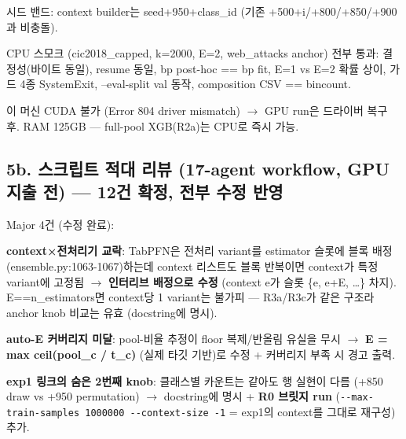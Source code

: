 \par\noindent \textbullet\enspace 시드 밴드: context builder는 seed+\allowbreak{}950+\allowbreak{}class\_\allowbreak{}id (기존 +\allowbreak{}500+\allowbreak{}i/\allowbreak{}+\allowbreak{}800/\allowbreak{}+\allowbreak{}850/\allowbreak{}+\allowbreak{}900과 비충돌).


\par\noindent \textbullet\enspace CPU 스모크 (cic2018\_\allowbreak{}capped, k=\allowbreak{}2000, E=\allowbreak{}2, web\_\allowbreak{}attacks anchor) 전부 통과: 결정성(바이트 동일), resume 동일, bp post-hoc =\allowbreak{}=\allowbreak{} bp fit, E=\allowbreak{}1 vs E=\allowbreak{}2 확률 상이, 가드 4종 SystemExit, --eval-split val 동작, composition CSV =\allowbreak{}=\allowbreak{} bincount.


\par\noindent \textbullet\enspace 이 머신 CUDA 불가 (Error 804 driver mismatch)  \ensuremath{\rightarrow}  GPU run은 드라이버 복구 후. RAM 125GB — full-pool XGB(R2a)는 CPU로 즉시 가능.


\subsection{5b. 스크립트 적대 리뷰 (17-agent workflow, GPU 지출 전) — 12건 확정, 전부 수정 반영}
Major 4건 (수정 완료):

\par\noindent \textbullet\enspace \textbf{context×전처리기 교락}: TabPFN은 전처리 variant를 estimator 슬롯에 블록 배정 (ensemble.py:1063-1067)하는데 context 리스트도 블록 반복이면 context가 특정 variant에 고정됨  \ensuremath{\rightarrow}  \textbf{인터리브 배정으로 수정} (context e가 슬롯 \{e, e+\allowbreak{}E, …\} 차지). E=\allowbreak{}=\allowbreak{}n\_\allowbreak{}estimators면 context당 1 variant는 불가피 — R3a/\allowbreak{}R3c가 같은 구조라 anchor knob 비교는 유효 (docstring에 명시).


\par\noindent \textbullet\enspace \textbf{auto-E 커버리지 미달}: pool-비율 추정이 floor 복제/\allowbreak{}반올림 유실을 무시  \ensuremath{\rightarrow}  \textbf{E =\allowbreak{} max ceil(pool\_\allowbreak{}c /\allowbreak{} t\_\allowbreak{}c)} (실제 타깃 기반)로 수정 +\allowbreak{} 커버리지 부족 시 경고 출력.


\par\noindent \textbullet\enspace \textbf{exp1 링크의 숨은 2번째 knob}: 클래스별 카운트는 같아도 행 실현이 다름 (+\allowbreak{}850 draw vs +\allowbreak{}950 permutation)  \ensuremath{\rightarrow}  docstring에 명시 +\allowbreak{} \textbf{R0 브릿지 run} (\texttt{-\allowbreak{}-\allowbreak{}max-\allowbreak{}tr\allowbreak{}ain-\allowbreak{}samp\allowbreak{}les 1000\allowbreak{}000 -\allowbreak{}-\allowbreak{}co\allowbreak{}ntext-\allowbreak{}si\allowbreak{}ze -\allowbreak{}1} =\allowbreak{} exp1의 context를 그대로 재구성) 추가.


